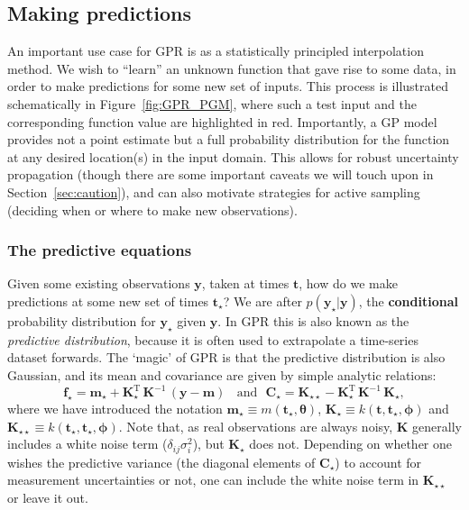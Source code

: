 \documentclass[letterpaper]{ar-1col}
\newcommand{\hyperparams}{\ensuremath{\boldsymbol{\phi}}}
\newcommand{\meanparams}{\ensuremath{\boldsymbol{\theta}}}
\begin{document}
\subsection{Making predictions}
\label{sec:pred}

An important use case for GPR is as a statistically principled interpolation method. We wish to ``learn'' an unknown function that gave rise to some data, in order to make predictions for some new set of inputs. This process is illustrated schematically in Figure~\ref{fig:GPR_PGM}, where such a test input and the corresponding function value are highlighted in red. Importantly, a GP model provides not a point estimate but a full probability distribution for the function at any desired location(s) in the input domain. This allows for robust uncertainty propagation (though there are some important caveats we will touch upon in Section~\ref{sec:caution}), and can also motivate strategies for active sampling (deciding when or where to make new observations).

\subsubsection{The predictive equations}\label{sec:predeq}

Given some existing observations $\mathbf{y}$, taken at times $\mathbf{t}$, how do we make predictions at some new set of times $\mathbf{t}_\star$? We are after $p(\mathbf{y}_\star|\mathbf{y})$, the \textbf{conditional} probability distribution for $\mathbf{y}_\star$ given $\mathbf{y}$. In GPR this is also known as the \emph{predictive distribution}, because it is often used to extrapolate a time-series dataset forwards. The `magic' of GPR is that the predictive distribution is also Gaussian, and its mean and covariance are given by simple analytic relations:
\begin{equation}
  \label{eq:pred}
  \mathbf{f}_\star = \mathbf{m}_\star + \mathbf{K}_\star^{\mathrm{T}} \, \mathbf{K}^{-1} \, (\mathbf{y} - \mathbf{m}) ~\mathrm{~~~and~~~}
  \mathbf{C}_\star =   \mathbf{K}_{\star\star} - \mathbf{K}_\star^{\mathrm{T}} \, \mathbf{K}^{-1} \, \mathbf{K}_\star,
\end{equation}
where we have introduced the notation $\mathbf{m}_\star \equiv m(\mathbf{t}_\star,\meanparams)$, $\mathbf{K}_\star \equiv k(\mathbf{t},\mathbf{t}_\star, \hyperparams)$ and
$\mathbf{K}_{\star\star} \equiv k(\mathbf{t}_\star,\mathbf{t}_\star,\hyperparams)$. Note that, as real observations are always noisy, $\mathbf{K}$ generally includes a white noise term ($\delta_{ij} \sigma^2_i$), but $\mathbf{K}_\star$ does not. Depending on whether one wishes the predictive variance (the diagonal elements of $\mathbf{C}_\star$)  to account for measurement uncertainties or not, one can include the white noise term in $\mathbf{K}_{\star\star}$ or leave it out.
\end{document}
